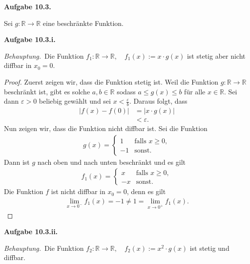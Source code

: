 \documentclass[12pt]{extarticle}
\newcommand{\beh}{\textit{Behauptung.}\ }
\newcommand{\aufgn}[1]{\textbf{Aufgabe #1.}}
\newcommand{\mg}[1]{\mathbb{#1}}
\begin{document}
\aufgn{10.3}

Sei \(g \colon \mg{R} \to \mg{R}\) eine beschränkte
Funktion.

\aufgn{10.3.i}

\beh Die Funktion $f_1 \colon \mg{R} \to \mg{R}, \quad
f_1(x) := x \cdot g(x)$ ist stetig aber nicht
diffbar in \(x_0 = 0\).

\begin{proof}
  Zuerst zeigen wir, dass die Funktion stetig ist.  Weil
  die Funktion \(g \colon \mg{R} \to \mg{R}\) beschränkt
  ist, gibt es solche \(a, b \in \mg{R}\) sodass
  \(a \le g(x) \le b\) für alle \(x \in \mg{R}\).  Sei dann
  \(\varepsilon > 0\) beliebig gewählt und sei
  \(x < \frac{\varepsilon}{b}\).  Daraus folgt, dass
\begin{align*}
  \left| f(x) - f(0) \right|
  &= \left| x \cdot g(x) \right| \\
  &< \varepsilon.
\end{align*}
Nun zeigen wir, dass die Funktion nicht diffbar ist.
Sei die Funktion
\begin{align*}
  g(x) =
\begin{cases}
  1 &\text{falls } x \ge 0, \\
  -1 &\text{sonst.}
\end{cases}
\end{align*}
Dann ist \(g\) nach oben und nach unten beschränkt und es
gilt
\begin{align*}
f_1(x)=
\begin{cases}
  x &\text{falls } x \ge 0, \\
  -x &\text{sonst.}
\end{cases}
\end{align*}
Die Funktion \(f\) ist nicht diffbar in \(x_0 = 0\), denn es
gilt
\begin{align*}
  \lim_{x \to 0^-}{f_1(x)}
  = -1 \ne 1 = \lim_{x \to 0^+}{f_1(x)}.
\end{align*}
\end{proof}

\aufgn{10.3.ii}

\beh Die Funktion $f_2 \colon \mg{R} \to \mg{R}, \quad
f_2(x) := x^2 \cdot g(x)$ ist stetig und diffbar.
\end{document}
